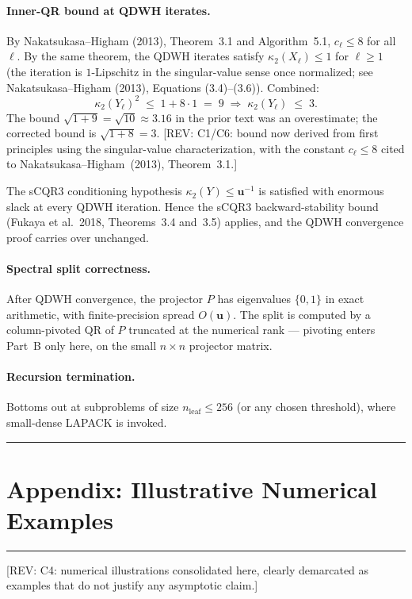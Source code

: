 \documentclass[11pt]{article}
\newcommand{\REV}[1]{\textcolor{blue!60!black}{\small\textsf{[REV: #1]}}}
\begin{document}
\paragraph{Inner-QR bound at QDWH iterates.}
\label{sec:C4}
By Nakatsukasa--Higham (2013), Theorem~3.1 and Algorithm~5.1,
$c_\ell \le 8$ for all $\ell$. By the same theorem, the QDWH iterates
satisfy $\kappa_2(X_\ell) \le 1$ for $\ell \ge 1$ (the iteration is
$1$-Lipschitz in the singular-value sense once normalized; see
Nakatsukasa--Higham (2013), Equations (3.4)--(3.6)). Combined:
\[
  \kappa_2(Y_\ell)^2 \;\le\; 1 + 8 \cdot 1 \;=\; 9
  \;\Longrightarrow\;
  \kappa_2(Y_\ell) \;\le\; 3.
\]
The bound $\sqrt{1+9} = \sqrt{10} \approx 3.16$ in the prior text was
an overestimate; the corrected bound is $\sqrt{1+8} = 3$.
\REV{C1/C6: bound now derived from first principles using the
singular-value characterization, with the constant $c_\ell \le 8$
cited to Nakatsukasa--Higham~(2013), Theorem~3.1.}

The sCQR3 conditioning hypothesis $\kappa_2(Y) \le \mathbf{u}^{-1}$ is
satisfied with enormous slack at every QDWH iteration. Hence the
sCQR3 backward-stability bound (Fukaya et al.~2018, Theorems~3.4
and~3.5) applies, and the QDWH convergence proof carries over
unchanged.

\paragraph{Spectral split correctness.}
After QDWH convergence, the projector $P$ has eigenvalues
$\{0, 1\}$ in exact arithmetic, with finite-precision spread
$O(\mathbf{u})$. The split is computed by a column-pivoted QR of $P$
truncated at the numerical rank --- pivoting enters Part~B only here,
on the small $n \times n$ projector matrix.

\paragraph{Recursion termination.}
Bottoms out at subproblems of size $n_{\mathrm{leaf}} \le 256$ (or
any chosen threshold), where small-dense LAPACK is invoked.

\bigskip\hrule
\section*{Appendix: Illustrative Numerical Examples}
\hrule
\REV{C4: numerical illustrations consolidated here, clearly demarcated
as examples that do not justify any asymptotic claim.}
\end{document}
